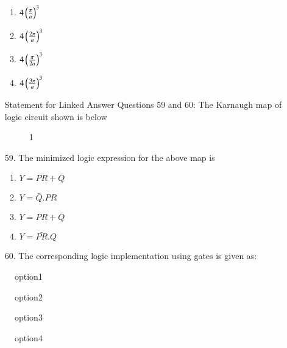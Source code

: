 \documentclass[journal]{IEEEtran}
\begin{document}
\begin{enumerate}
\begin{enumerate}[label=(\Alph*)]
        \item $4\left(\frac{\pi}{a}\right)^3$
        \item $4\left(\frac{2\pi}{a}\right)^3$
        \item $4\left(\frac{\pi}{2a}\right)^3$
        \item $4\left(\frac{3\pi}{a}\right)^3$
    \end{enumerate}
    Statement for Linked Answer Questions 59 and 60:
    The Karnaugh map of logic circuit shown is below 
    \begin{figure}[!ht]
        \centering
        \caption{1}
        \label{fig1}
    \end{figure}
    \item[59.] The minimized logic expression for the above map is 
    \begin{enumerate}[label=(\Alph*)]
        \item $Y=\bar{PR} + \bar{Q}$
        \item $Y=\bar{Q} .PR$
        \item $Y=PR + \bar{Q}$
        \item $Y=\bar{PR}.Q$
    \end{enumerate}
    \item[60.] The corresponding logic implementation using gates is given as:
     \end{enumerate}
    \begin{figure}[!ht]
        \centering
        \caption{option1}
    \end{figure}
    \begin{figure}[!ht]
        \centering
        \caption{option2}
    \end{figure}
    \begin{figure}[!ht]
        \centering
        \caption{option3}
    \end{figure}
    \begin{figure}[!ht]
        \centering
        \caption{option4}
    \end{figure}
\end{document}
